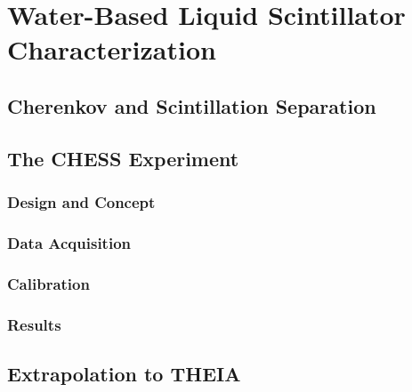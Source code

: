 \chapter{Water-Based Liquid Scintillator Characterization}
\label{ch:wbls}

\section{Cherenkov and Scintillation Separation}

\section{The CHESS Experiment}

\subsection{Design and Concept}

\subsection{Data Acquisition}

\subsection{Calibration}

\subsection{Results}

\section{Extrapolation to T\textsc{HEIA}}
